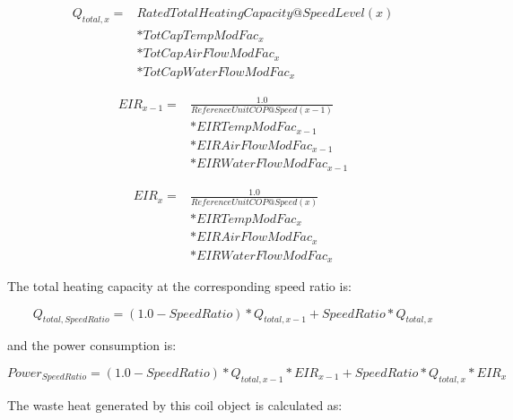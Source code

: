 \begin{equation}
  \begin{array}{rl}
    Q_{total,x} =& RatedTotalHeatingCapacity@SpeedLevel\left( x \right) \\
                &* TotCapTempModFac_x \\
                &* TotCapAirFlowModFac_x \\
                &* TotCapWaterFlowModFac_x
 \end{array}
\end{equation}

\begin{equation}
  \begin{array}{rl}
    EIR_{x - 1} =& \frac{1.0}{ReferenceUnitCOP@Speed(x - 1)} \\
                &* EIRTempModFac_{x - 1} \\
                &* EIRAirFlowModFac_{x - 1} \\
                &* EIRWaterFlowModFac_{x - 1}
  \end{array}
\end{equation}

\begin{equation}
  \begin{array}{rl}
    EIR_x =& \frac{1.0}{ReferenceUnitCOP@Speed(x)} \\
                &* EIRTempModFac_{x} \\
                &* EIRAirFlowModFac_{x} \\
                &* EIRWaterFlowModFac_{x}
  \end{array}
\end{equation}

The total heating capacity at the corresponding speed ratio is:

\begin{equation}
{Q_{total,SpeedRatio}} = \left( {1.0 - SpeedRatio} \right)*{Q_{total,x - 1}} + SpeedRatio*{Q_{total,x}}
\end{equation}

and the power consumption is:

\begin{equation}
Powe{r_{SpeedRatio}} = \left( {1.0 - SpeedRatio} \right)*{Q_{total,x - 1}}*EI{R_{x - 1}} + SpeedRatio*{Q_{total,x}}*EI{R_x}
\end{equation}

The waste heat generated by this coil object is calculated as:

